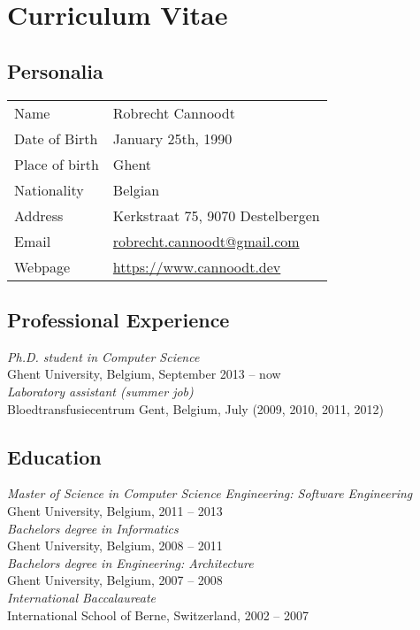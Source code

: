 \appendix


\newpage{\thispagestyle{empty}\cleardoublepage}
\chapter{Curriculum Vitae}
\section{Personalia}
\begin{tabular}{ll}
	Name & Robrecht Cannoodt \\
	Date of Birth & January 25th, 1990 \\
	Place of birth & Ghent \\
	Nationality & Belgian \\
	Address & Kerkstraat 75, 9070 Destelbergen \\
	Email & \href{mailto:robrecht.cannoodt@gmail.com}{robrecht.cannoodt@gmail.com} \\
	Webpage & \url{https://www.cannoodt.dev}
\end{tabular}


\section{Professional Experience}
\textit{Ph.D. student in Computer Science} \\
\hspace*{2 ex} Ghent University, Belgium, September 2013 -- now \\
\textit{Laboratory assistant (summer job)} \\
\hspace*{2 ex} Bloedtransfusiecentrum Gent, Belgium, July (2009, 2010, 2011, 2012)


\section{Education} 
\textit{Master of Science in Computer Science Engineering: Software Engineering} \\
\hspace*{2 ex} Ghent University, Belgium, 2011 -- 2013 \vspace*{1mm}\\ 
\textit{Bachelors degree in Informatics}\\
\hspace*{2 ex} Ghent University, Belgium, 2008 -- 2011 \vspace*{1mm} \\
\textit{Bachelors degree in Engineering: Architecture} \\
\hspace*{2 ex} Ghent University, Belgium, 2007 -- 2008  \vspace*{1mm}\\
\textit{International Baccalaureate} \\
\hspace*{2 ex} International School of Berne, Switzerland, 2002 -- 2007


